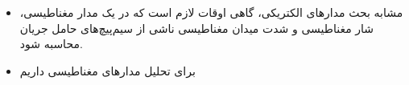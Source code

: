 \begin{ELunit}


\begin{itemize}
\tightlist
\item
  مشابه بحث مدارهای الکتریکی، گاهی اوقات لازم است که در یک مدار مغناطیسی، شار مغناطیسی و شدت میدان مغناطیسی ناشی از سیم‌پیچ‌های حامل جریان محاسبه شود.
\item
  برای تحلیل مدارهای مغناطیسی داریم
\end{itemize}


\end{ELunit}

